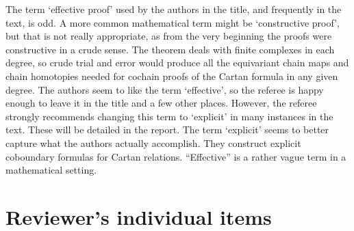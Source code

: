 \documentclass{amsart}
\begin{document}
The term ‘effective proof’ used by the authors in the title, and frequently in the text, is odd.
A more common mathematical term might be ‘constructive proof’, but that is not really appropriate, as from the very beginning the proofs were constructive in a crude sense.
The theorem deals with finite complexes in each degree, so crude trial and error would produce all the equivariant chain maps and chain homotopies needed for cochain proofs of the Cartan formula in any given degree.
The authors seem to like the term ‘effective’, so the referee is happy enough to leave it in the title and a few other places.
However, the referee strongly recommends changing this term to ‘explicit’ in many instances in the text.
These will be detailed in the report.
The term ‘explicit’ seems to better capture what the authors actually accomplish.
They construct explicit coboundary formulas for Cartan relations.
``Effective'' is a rather vague term in a mathematical setting.

\section{Reviewer's individual items}
\end{document}
